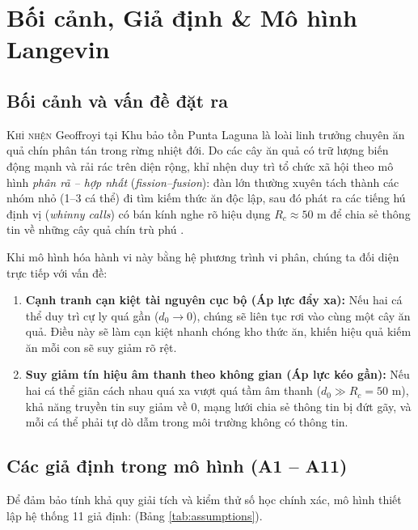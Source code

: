 \documentclass[11pt,a4paper]{report}
\begin{document}
\clearpage
\tableofcontents
\clearpage
{}

\FloatBarrier
\chapter{Bối cảnh, Giả định \& Mô hình Langevin}

\section{Bối cảnh và vấn đề đặt ra}
\lettrine{K}{hỉ nhện} Geoffroyi tại Khu bảo tồn Punta Laguna là loài linh trưởng chuyên ăn quả chín phân tán trong rừng nhiệt đới. Do các cây ăn quả có trữ lượng biến động mạnh và rải rác trên diện rộng, khỉ nhện duy trì tổ chức xã hội theo mô hình \textit{phân rã -- hợp nhất} (\textit{fission--fusion}): đàn lớn thường xuyên tách thành các nhóm nhỏ (1--3 cá thể) đi tìm kiếm thức ăn độc lập, sau đó phát ra các tiếng hú định vị (\textit{whinny calls}) có bán kính nghe rõ hiệu dụng $R_c \approx 50\text{ m}$ để chia sẻ thông tin về những cây quả chín trù phú \cite{ramos, martinez}.

Khi mô hình hóa hành vi này bằng hệ phương trình vi phân, chúng ta đối diện trực tiếp với vấn đề:
\begin{enumerate}
  \item \textbf{Cạnh tranh cạn kiệt tài nguyên cục bộ (Áp lực đẩy xa):} Nếu hai cá thể duy trì cự ly quá gần ($d_0 \to 0$), chúng sẽ liên tục rơi vào cùng một cây ăn quả. Điều này sẽ làm cạn kiệt nhanh chóng kho thức ăn, khiến hiệu quả kiếm ăn mỗi con sẽ suy giảm rõ rệt.
  \item \textbf{Suy giảm tín hiệu âm thanh theo không gian (Áp lực kéo gần):} Nếu hai cá thể giãn cách nhau quá xa vượt quá tầm âm thanh ($d_0 \gg R_c = 50\text{ m}$), khả năng truyền tin suy giảm về $0$, mạng lưới chia sẻ thông tin bị đứt gãy, và mỗi cá thể phải tự dò dẫm trong môi trường không có thông tin.
\end{enumerate}

\section{Các giả định trong mô hình (A1 -- A11)}
Để đảm bảo tính khả quy giải tích và kiểm thử số học chính xác, mô hình thiết lập hệ thống 11 giả định: (Bảng \ref{tab:assumptions}).
\end{document}
